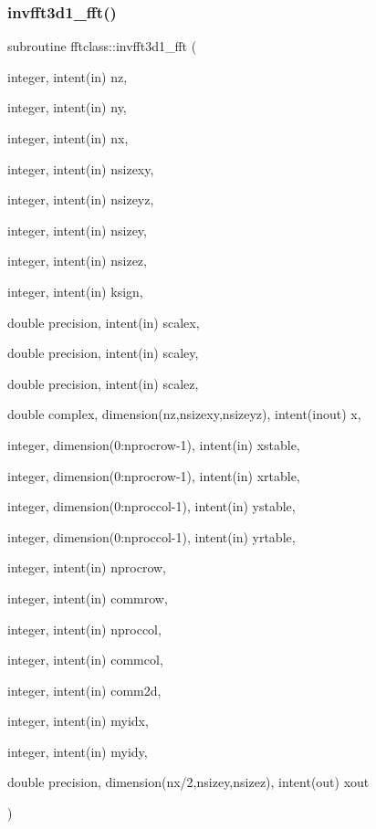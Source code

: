\subsubsection{\texorpdfstring{invfft3d1\_fft()}{invfft3d1\_fft()}}
{\footnotesize\ttfamily subroutine fftclass\+::invfft3d1\+\_\+fft (\begin{DoxyParamCaption}\item[{integer, intent(in)}]{nz,  }\item[{integer, intent(in)}]{ny,  }\item[{integer, intent(in)}]{nx,  }\item[{integer, intent(in)}]{nsizexy,  }\item[{integer, intent(in)}]{nsizeyz,  }\item[{integer, intent(in)}]{nsizey,  }\item[{integer, intent(in)}]{nsizez,  }\item[{integer, intent(in)}]{ksign,  }\item[{double precision, intent(in)}]{scalex,  }\item[{double precision, intent(in)}]{scaley,  }\item[{double precision, intent(in)}]{scalez,  }\item[{double complex, dimension(nz,nsizexy,nsizeyz), intent(inout)}]{x,  }\item[{integer, dimension(0\+:nprocrow-\/1), intent(in)}]{xstable,  }\item[{integer, dimension(0\+:nprocrow-\/1), intent(in)}]{xrtable,  }\item[{integer, dimension(0\+:nproccol-\/1), intent(in)}]{ystable,  }\item[{integer, dimension(0\+:nproccol-\/1), intent(in)}]{yrtable,  }\item[{integer, intent(in)}]{nprocrow,  }\item[{integer, intent(in)}]{commrow,  }\item[{integer, intent(in)}]{nproccol,  }\item[{integer, intent(in)}]{commcol,  }\item[{integer, intent(in)}]{comm2d,  }\item[{integer, intent(in)}]{myidx,  }\item[{integer, intent(in)}]{myidy,  }\item[{double precision, dimension(nx/2,nsizey,nsizez), intent(out)}]{xout }\end{DoxyParamCaption})}



